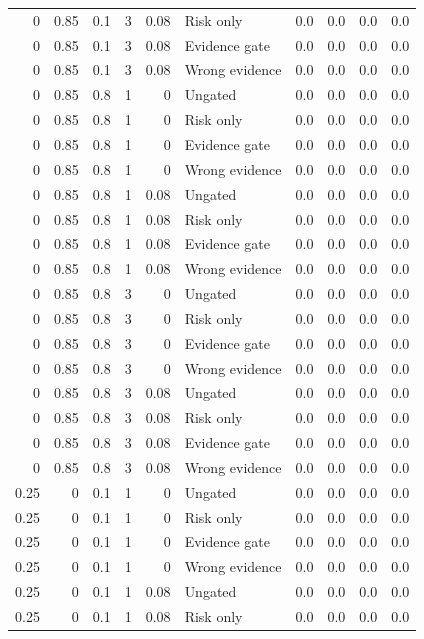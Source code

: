 \begin{longtable}{rrrrrlrrrr}
0 & 0.85 & 0.1 & 3 & 0.08 & Risk only & 0.0 & 0.0 & 0.0 & 0.0\\
0 & 0.85 & 0.1 & 3 & 0.08 & Evidence gate & 0.0 & 0.0 & 0.0 & 0.0\\
0 & 0.85 & 0.1 & 3 & 0.08 & Wrong evidence & 0.0 & 0.0 & 0.0 & 0.0\\
0 & 0.85 & 0.8 & 1 & 0 & Ungated & 0.0 & 0.0 & 0.0 & 0.0\\
0 & 0.85 & 0.8 & 1 & 0 & Risk only & 0.0 & 0.0 & 0.0 & 0.0\\
0 & 0.85 & 0.8 & 1 & 0 & Evidence gate & 0.0 & 0.0 & 0.0 & 0.0\\
0 & 0.85 & 0.8 & 1 & 0 & Wrong evidence & 0.0 & 0.0 & 0.0 & 0.0\\
0 & 0.85 & 0.8 & 1 & 0.08 & Ungated & 0.0 & 0.0 & 0.0 & 0.0\\
0 & 0.85 & 0.8 & 1 & 0.08 & Risk only & 0.0 & 0.0 & 0.0 & 0.0\\
0 & 0.85 & 0.8 & 1 & 0.08 & Evidence gate & 0.0 & 0.0 & 0.0 & 0.0\\
0 & 0.85 & 0.8 & 1 & 0.08 & Wrong evidence & 0.0 & 0.0 & 0.0 & 0.0\\
0 & 0.85 & 0.8 & 3 & 0 & Ungated & 0.0 & 0.0 & 0.0 & 0.0\\
0 & 0.85 & 0.8 & 3 & 0 & Risk only & 0.0 & 0.0 & 0.0 & 0.0\\
0 & 0.85 & 0.8 & 3 & 0 & Evidence gate & 0.0 & 0.0 & 0.0 & 0.0\\
0 & 0.85 & 0.8 & 3 & 0 & Wrong evidence & 0.0 & 0.0 & 0.0 & 0.0\\
0 & 0.85 & 0.8 & 3 & 0.08 & Ungated & 0.0 & 0.0 & 0.0 & 0.0\\
0 & 0.85 & 0.8 & 3 & 0.08 & Risk only & 0.0 & 0.0 & 0.0 & 0.0\\
0 & 0.85 & 0.8 & 3 & 0.08 & Evidence gate & 0.0 & 0.0 & 0.0 & 0.0\\
0 & 0.85 & 0.8 & 3 & 0.08 & Wrong evidence & 0.0 & 0.0 & 0.0 & 0.0\\
0.25 & 0 & 0.1 & 1 & 0 & Ungated & 0.0 & 0.0 & 0.0 & 0.0\\
0.25 & 0 & 0.1 & 1 & 0 & Risk only & 0.0 & 0.0 & 0.0 & 0.0\\
0.25 & 0 & 0.1 & 1 & 0 & Evidence gate & 0.0 & 0.0 & 0.0 & 0.0\\
0.25 & 0 & 0.1 & 1 & 0 & Wrong evidence & 0.0 & 0.0 & 0.0 & 0.0\\
0.25 & 0 & 0.1 & 1 & 0.08 & Ungated & 0.0 & 0.0 & 0.0 & 0.0\\
0.25 & 0 & 0.1 & 1 & 0.08 & Risk only & 0.0 & 0.0 & 0.0 & 0.0\\

\end{longtable}
